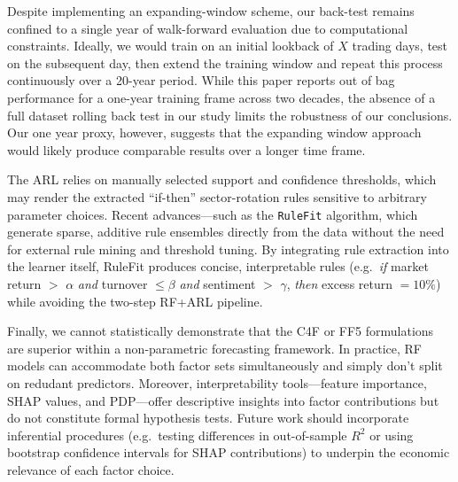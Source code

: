 
Despite implementing an expanding-window scheme, our back-test remains confined to a single year of walk-forward evaluation due to computational constraints. Ideally, we would train on an initial lookback of $X$ trading days, test on the subsequent day, then extend the training window and repeat this process continuously over a 20-year period. While this paper reports out of bag performance for a one-year training frame across two decades, the absence of a full dataset rolling back test in our study limits the robustness of our conclusions. Our one year proxy, however, suggests that the expanding window approach would likely produce comparable results over a longer time frame.

The ARL relies on manually selected support and confidence thresholds, which may render the extracted “if-then” sector-rotation rules sensitive to arbitrary parameter choices. Recent advances—such as the \texttt{RuleFit} algorithm, which generate sparse, additive rule ensembles directly from the data without the need for external rule mining and threshold tuning. By integrating rule extraction into the learner itself, RuleFit produces concise, interpretable rules (e.g.\ \emph{if} market return $>$ $\alpha$ \emph{and} turnover $\le \beta$ \emph{and} sentiment $>$ $\gamma$, \emph{then} excess return $=10\%$) while avoiding the two-step RF+ARL pipeline.

Finally, we cannot statistically demonstrate that the C4F or FF5 formulations are superior within a non-parametric forecasting framework. In practice, RF models can accommodate both factor sets simultaneously and simply don't split on redudant predictors. Moreover, interpretability tools—feature importance, SHAP values, and PDP—offer descriptive insights into factor contributions but do not constitute formal hypothesis tests. Future work should incorporate inferential procedures (e.g.\ testing differences in out-of-sample $R^2$ or using bootstrap confidence intervals for SHAP contributions) to underpin the economic relevance of each factor choice.

